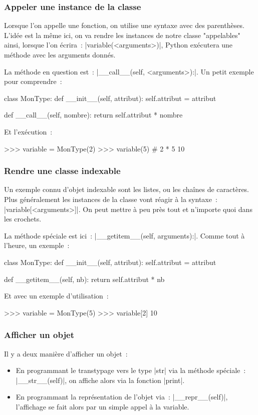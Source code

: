 		\subsubsection{Appeler une instance de la classe}
		Lorsque l'on appelle une fonction, on utilise une syntaxe avec des parenthèses. L'idée est la même ici, on va rendre les instances de notre classe "appelables" ainsi, lorsque l'on écrira~: \python|variable(<arguments>)|, Python exécutera une méthode avec les arguments donnés.
		
		La méthode en question est~: \python|__call__(self, <arguments>):|. Un petit exemple pour comprendre~:
		\begin{pythoncode}
			class MonType:
				def __init__(self, attribut):
					self.attribut = attribut
				
				def __call__(self, nombre):
					return self.attribut * nombre
		\end{pythoncode}
		Et l'exécution~:
		\begin{pythoncode}
			>>> variable = MonType(2)
			>>> variable(5) # 2 * 5
			10
		\end{pythoncode}
		
		\subsubsection{Rendre une classe indexable}
		Un exemple connu d'objet indexable sont les listes, ou les chaînes de caractères. Plus généralement les instances de la classe vont réagir à la syntaxe~: \python|variable[<arguments>]|. On peut mettre à peu près tout et n'importe quoi dans les crochets.
		
		La méthode spéciale est ici~: \python|__getitem__(self, arguments):|. Comme tout à l'heure, un exemple~:
		\begin{pythoncode}
			class MonType:
				def __init__(self, attribut):
					self.attribut = attribut
				
				def __getitem__(self, nb):
					return self.attribut * nb
		\end{pythoncode}
		Et avec un exemple d'utilisation~:
		\begin{pythoncode}
			>>> variable = MonType(5)
			>>> variable[2]
			10
		\end{pythoncode}
		
		\subsubsection{Afficher un objet}
		Il y a deux manière d'afficher un objet~:
		\begin{itemize}
			\item En programmant le transtypage vers le type \python|str| via la méthode spéciale~: \python|__str__(self)|, on affiche alors via la fonction \python|print|.
			\item En programmant la représentation de l'objet via~: \python|__repr__(self)|, l'affichage se fait alors par un simple appel à la variable.
		\end{itemize}
		
